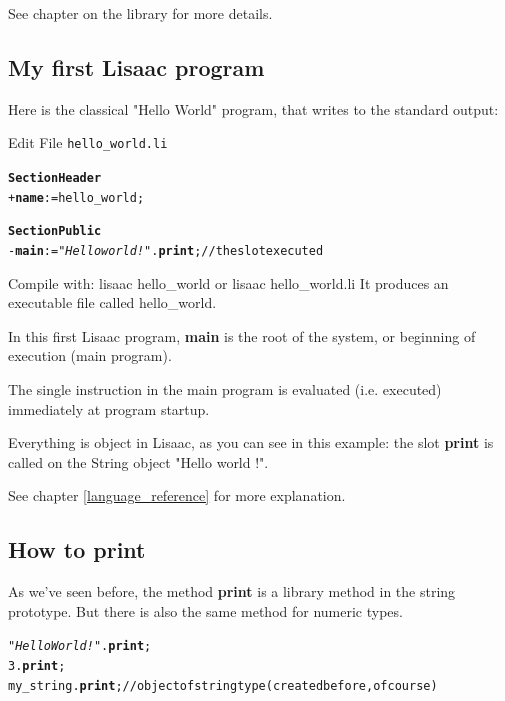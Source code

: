 \documentclass[11pt]{mybook}
\begin{document}
See chapter on the library for more details.

\subsection{My first Lisaac program}
\label{quickstart:write:first_prog}
%

Here is the classical "Hello World" program, that writes to the
standard output:

Edit File {\tt{}hello\_world.li}

\begin{alltt} 
{\bf{}Section Header}
  + {\bf{}name} := {\sc{}hello\_world};

{\bf{}Section Public}  
  - {\bf{}main} := {\it{}"Hello world !"}.{\bf{}print};    // the slot executed
\end{alltt}

Compile with: lisaac hello\_world  or lisaac hello\_world.li
It produces an executable file called hello\_world.

In this first Lisaac program, {\bf{}main} is the root of the system, or beginning of execution (main
program). 

The single instruction in the main program is evaluated (i.e. executed) immediately at program startup.

Everything is object in Lisaac, as you can see in this example: the slot {\bf{}print} is called on the String object "Hello world !".

See chapter \ref{language_reference} for more explanation.

\subsection{How to print}
\label{quickstart:write:print}
%
As we've seen before, the method {\bf{}print} is a library method in the {\sc{}string} prototype.
But there is also the same method for {\sc{}numeric} types.

\begin{alltt} 
   {\it{}"Hello World !"}.{\bf{}print};
   3.{\bf{}print};
   my\_string.{\bf{}print};      // object of {\sc{}string} type (created before, of course)
\end{alltt}
\end{document}
